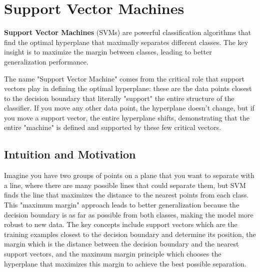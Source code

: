 
\section{Support Vector Machines }
\label{sec:svm}

\textbf{Support Vector Machines} (SVMs) are powerful classification algorithms that find the optimal hyperplane that maximally separates different classes. The key insight is to maximize the margin between classes, leading to better generalization performance.

\begin{remark}
The name "Support Vector Machine" comes from the critical role that support vectors play in defining the optimal hyperplane: these are the data points closest to the decision boundary that literally "support" the entire structure of the classifier. If you move any other data point, the hyperplane doesn't change, but if you move a support vector, the entire hyperplane shifts, demonstrating that the entire "machine" is defined and supported by these few critical vectors.
\end{remark}

\subsection{Intuition and Motivation}

Imagine you have two groups of points on a plane that you want to separate with a line, where there are many possible lines that could separate them, but SVM finds the line that maximizes the distance to the nearest points from each class. This "maximum margin" approach leads to better generalization because the decision boundary is as far as possible from both classes, making the model more robust to new data. The key concepts include support vectors which are the training examples closest to the decision boundary and determine its position, the margin which is the distance between the decision boundary and the nearest support vectors, and the maximum margin principle which chooses the hyperplane that maximizes this margin to achieve the best possible separation.

